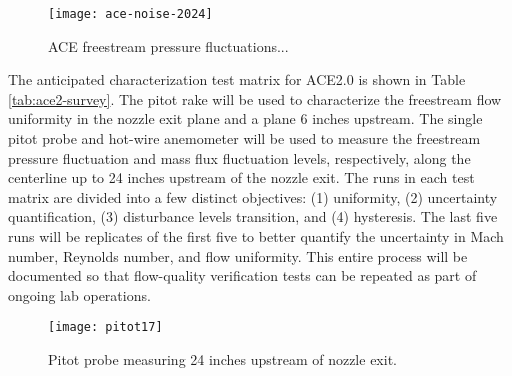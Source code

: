 \begin{figure}[ht!]
    \centering
    \texttt{[image: ace-noise-2024]}
    \caption{ACE freestream pressure fluctuations...}
    \label{fig:ace-survey}
\end{figure}

The anticipated characterization test matrix for ACE2.0 is shown in Table \ref{tab:ace2-survey}. The pitot rake will be used to characterize the freestream flow uniformity in the nozzle exit plane and a plane 6 inches upstream. The single pitot probe and hot-wire anemometer will be used to measure the freestream pressure fluctuation and mass flux fluctuation levels, respectively, along the centerline up to 24 inches upstream of the nozzle exit. The runs in each test matrix are divided into a few distinct objectives: (1) uniformity, (2) uncertainty quantification, (3) disturbance levels transition, and (4) hysteresis. The last five runs will be replicates of the first five to better quantify the uncertainty in Mach number, Reynolds number, and flow uniformity. This entire process will be documented so that flow-quality verification tests can be repeated as part of ongoing lab operations.

\begin{figure}[ht!]
    \centering
    \texttt{[image: pitot17]}
    \caption{Pitot probe measuring 24 inches upstream of nozzle exit.}
    \label{fig:pitot17}
\end{figure}


